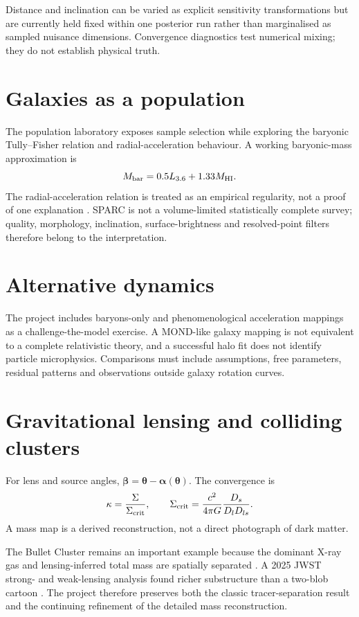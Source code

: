 \documentclass[11pt,a4paper]{article}
\begin{document}
Distance and inclination can be varied as explicit sensitivity transformations but are currently held fixed within one posterior run rather than marginalised as sampled nuisance dimensions. Convergence diagnostics test numerical mixing; they do not establish physical truth.

\section{Galaxies as a population}
The population laboratory exposes sample selection while exploring the baryonic Tully--Fisher relation and radial-acceleration behaviour. A working baryonic-mass approximation is
\begin{equation}
M_{\rm bar}=0.5L_{3.6}+1.33M_{\rm HI}.
\end{equation}
The radial-acceleration relation is treated as an empirical regularity, not a proof of one explanation \parencite{McGaugh2016}. SPARC is not a volume-limited statistically complete survey; quality, morphology, inclination, surface-brightness and resolved-point filters therefore belong to the interpretation.

\section{Alternative dynamics}
The project includes baryons-only and phenomenological acceleration mappings as a challenge-the-model exercise. A MOND-like galaxy mapping is not equivalent to a complete relativistic theory, and a successful halo fit does not identify particle microphysics. Comparisons must include assumptions, free parameters, residual patterns and observations outside galaxy rotation curves.

\section{Gravitational lensing and colliding clusters}
For lens and source angles, $\boldsymbol{\beta}=\boldsymbol{\theta}-\boldsymbol{\alpha}(\boldsymbol{\theta})$. The convergence is
\begin{equation}
\kappa=\frac{\Sigma}{\Sigma_{\rm crit}},\qquad \Sigma_{\rm crit}=\frac{c^2}{4\pi G}\frac{D_s}{D_lD_{ls}}.
\end{equation}
A mass map is a derived reconstruction, not a direct photograph of dark matter.

The Bullet Cluster remains an important example because the dominant X-ray gas and lensing-inferred total mass are spatially separated \parencite{Clowe2006}. A 2025 JWST strong- and weak-lensing analysis found richer substructure than a two-blob cartoon \parencite{Cha2025}. The project therefore preserves both the classic tracer-separation result and the continuing refinement of the detailed mass reconstruction.
\end{document}
